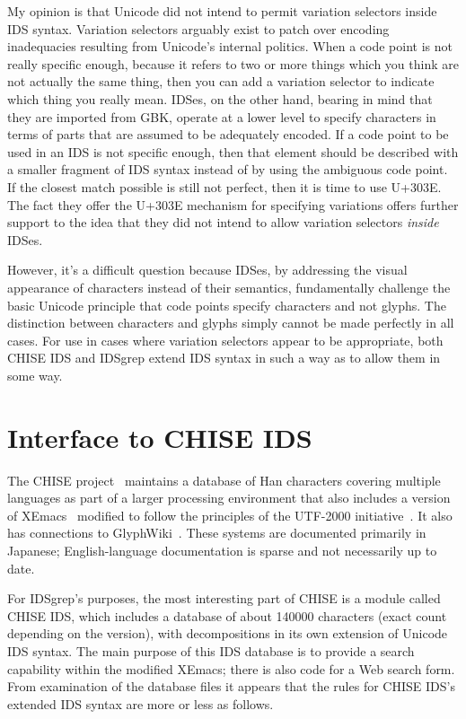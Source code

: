 \documentclass[twocolumn]{report}
\begin{document}
My opinion is that Unicode did not intend to permit variation selectors
inside IDS syntax.  Variation selectors arguably exist to patch over
encoding inadequacies resulting from Unicode's internal politics.  When a
code point is not really specific enough, because it refers to two or more
things which you think are not actually the same thing, then you can add a
variation selector to indicate which thing you really mean.  IDSes, on the
other hand, bearing in mind that they are imported from GBK, operate at a
lower level to specify characters in terms of parts that are assumed to be
adequately encoded.  If a code point to be used in an IDS is not specific
enough, then that element should be described with a smaller fragment of IDS
syntax instead of by using the ambiguous code point.  If the closest match
possible is still not perfect, then it is time to use U+303E.  The fact they
offer the U+303E mechanism for specifying variations offers further support
to the idea that they did not intend to allow variation selectors
\emph{inside} IDSes.

However, it's a difficult question because IDSes, by addressing the visual
appearance of characters instead of their semantics, fundamentally challenge
the basic Unicode principle that code points specify characters and not
glyphs.  The distinction between characters and glyphs simply cannot be made
perfectly in all cases.  For use in cases where variation selectors appear
to be appropriate, both CHISE IDS and IDSgrep extend IDS syntax in
such a way as to allow them in some way.


\section{Interface to CHISE IDS}

The CHISE project~\cite{CHISE} maintains a database of Han characters
covering multiple languages as part of a larger processing environment that
also includes a version of XEmacs~\cite{XEmacs} modified to follow the
principles of the UTF-2000 initiative~\cite{UTF2000}.  It also has
connections to GlyphWiki~\cite{GlyphWiki}. 
These systems are documented primarily in Japanese; English-language
documentation is sparse and not necessarily up to date.

For IDSgrep's purposes, the most interesting part of CHISE is a module
called CHISE IDS, which includes a database of about 140000 characters
(exact count depending on the version), with decompositions in its own
extension of Unicode IDS syntax.  The main purpose of this IDS database is
to provide a search capability within the modified XEmacs; there is also
code for a Web search form.  From examination of the database files it
appears that the rules for CHISE IDS's extended IDS syntax are more or less
as follows.
\end{document}
